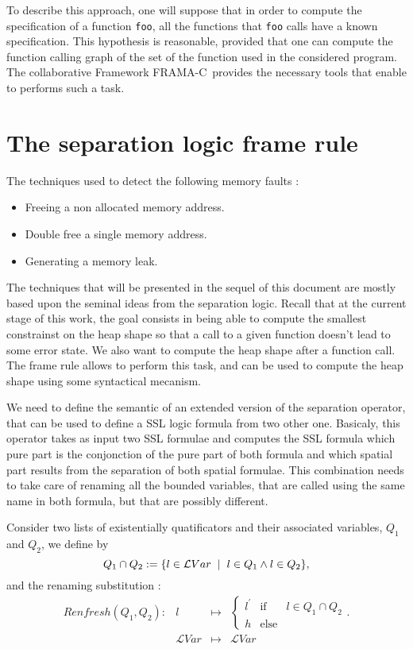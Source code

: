 \documentclass[a4paper,twoside,12pt]{report}
\newcommand{\defeq}[0]{:=}
\newcommand\LVar{\mathcal{L}Var} %
\newcommand{\fundec}[5]{\begin{array}{llll} {#1}:&{#2} &\mapsto & {#3} \\ &{#4} & \mapsto& #5  \end{array}}
\newcommand{\renfresh}[2]{Renfresh(#1,#2)}
\newcommand{\FRAMAC}{FRAMA-C}
\begin{document}
To describe this approach, one will suppose that in order to compute the specification of a function \lstinline!foo!, all the functions that \lstinline!foo! calls have a known specification.
This hypothesis is reasonable, provided that one can compute the function 
calling graph of the set of the function used in the considered program. 
The collaborative Framework \FRAMAC~provides the necessary tools that enable
to performs such a task.



\section{The separation logic frame rule}

The techniques used to detect the following memory faults :
\begin{itemize}
\item Freeing a non allocated memory address.
\item Double free a single memory address.
\item Generating a memory leak. 
\end{itemize}

The techniques that will be presented in the sequel of this document
are mostly based upon the seminal ideas from the separation logic. 
Recall that at the current stage of this work, the goal consists in
being able to compute the smallest constrainst on the heap shape
so that a call to a given function doesn't lead to some error state.
We also want to compute the heap shape after a function  call. 
The frame rule allows to  perform this task, and can be used to
compute the heap shape using some syntactical mecanism.

We need to define the semantic of an extended version of the separation
operator, that can be used to define a SSL logic formula from two other
one. Basicaly, this operator takes as input two SSL formulae and
computes the SSL formula which pure part is the conjonction of the pure part
of both formula and which spatial part results from the separation
of both spatial formulae. This combination needs to take care of renaming
all the bounded variables, that are called using the same name in both
formula, but that are possibly different.

Consider two lists of existentially quatificators and their 
associated variables, $Q_1$ and $Q_2$,  we define by 
$$
Q_1 \cap Q_2 \defeq \lbrace l \in \LVar \gspace | \gspace l \in Q_1 \land l \in Q_2 \rbrace,
$$
and the renaming substitution :
$$
\fundec{\renfresh{Q_1}{Q_2}}{l}{
	\left \lbrace \begin{array}{lll} l^{\prime} &\mbox{if }& l \in Q_1 \cap Q_2 \\ 
h
 &\mbox{else}& 
	\end{array} \right . .}{\LVar}{\LVar} 
$$
\end{document}
